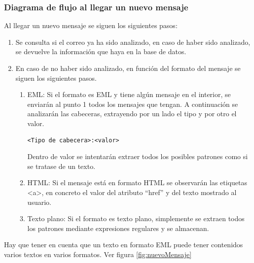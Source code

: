 \subsubsection{Diagrama de flujo al llegar un nuevo mensaje}
Al llegar un nuevo mensaje se siguen los siguientes pasos: 
\begin{enumerate}
    \item Se consulta si el correo ya ha sido analizado, en caso de haber sido analizado, se devuelve la información que haya en la base de datos.
    \item En caso de no haber sido analizado, en función del formato del mensaje se siguen los siguientes pasos.
        \begin{enumerate}
            \item EML: Si el formato es EML y tiene algún mensaje en el interior, se enviarán al punto 1 todos los mensajes que tengan.
            A continuación se analizarán las cabeceras, extrayendo por un lado el tipo y por otro el valor. 
            \begin{verbatim}
<Tipo de cabecera>:<valor>
            \end{verbatim}
            Dentro de valor se intentarán extraer todos los posibles patrones como si se tratase de un texto. 
            \item HTML: Si el mensaje está en formato HTML se observarán las etiquetas <a>, en concreto el valor del atributo “href” y del texto mostrado al usuario. 
            \item Texto plano: Si el formato es texto plano, simplemente se extraen todos los patrones mediante expresiones regulares y se almacenan.
        \end{enumerate}
\end{enumerate}

Hay que tener en cuenta que un texto en formato EML puede tener contenidos varios textos en varios formatos. Ver figura \ref{fig:nuevoMensaje}

